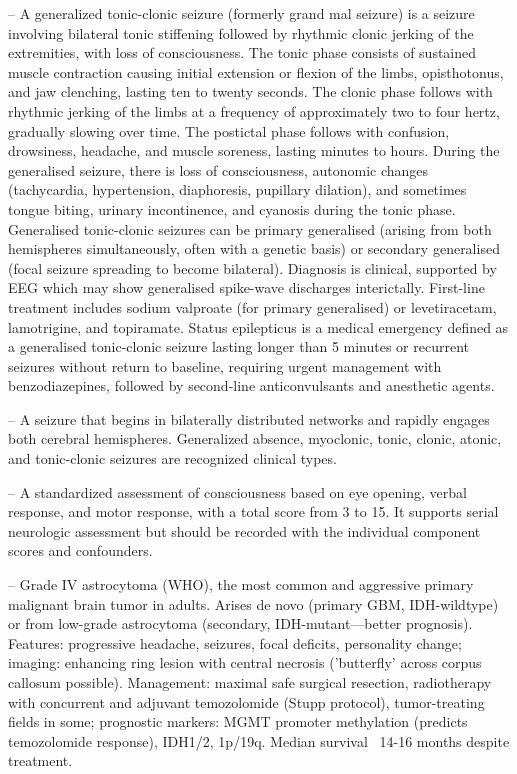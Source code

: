 -- A generalized tonic-clonic seizure (formerly grand mal seizure) is a seizure involving bilateral tonic stiffening followed by rhythmic clonic jerking of the extremities, with loss of consciousness. The tonic phase consists of sustained muscle contraction causing initial extension or flexion of the limbs, opisthotonus, and jaw clenching, lasting ten to twenty seconds. The clonic phase follows with rhythmic jerking of the limbs at a frequency of approximately two to four hertz, gradually slowing over time. The postictal phase follows with confusion, drowsiness, headache, and muscle soreness, lasting minutes to hours. During the generalised seizure, there is loss of consciousness, autonomic changes (tachycardia, hypertension, diaphoresis, pupillary dilation), and sometimes tongue biting, urinary incontinence, and cyanosis during the tonic phase. Generalised tonic-clonic seizures can be primary generalised (arising from both hemispheres simultaneously, often with a genetic basis) or secondary generalised (focal seizure spreading to become bilateral). Diagnosis is clinical, supported by EEG which may show generalised spike-wave discharges interictally. First-line treatment includes sodium valproate (for primary generalised) or levetiracetam, lamotrigine, and topiramate. Status epilepticus is a medical emergency defined as a generalised tonic-clonic seizure lasting longer than 5 minutes or recurrent seizures without return to baseline, requiring urgent management with benzodiazepines, followed by second-line anticonvulsants and anesthetic agents.

-- A seizure that begins in bilaterally distributed networks and rapidly engages both cerebral hemispheres. Generalized absence, myoclonic, tonic, clonic, atonic, and tonic-clonic seizures are recognized clinical types.

-- A standardized assessment of consciousness based on eye opening, verbal response, and motor response, with a total score from 3 to 15. It supports serial neurologic assessment but should be recorded with the individual component scores and confounders.

-- Grade IV astrocytoma (WHO), the most common and aggressive primary malignant brain tumor in adults. Arises de novo (primary GBM, IDH-wildtype) or from low-grade astrocytoma (secondary, IDH-mutant—better prognosis). Features: progressive headache, seizures, focal deficits, personality change; imaging: enhancing ring lesion with central necrosis ('butterfly' across corpus callosum possible). Management: maximal safe surgical resection, radiotherapy with concurrent and adjuvant temozolomide (Stupp protocol), tumor-treating fields in some; prognostic markers: MGMT promoter methylation (predicts temozolomide response), IDH1/2, 1p/19q. Median survival ~14-16 months despite treatment.

